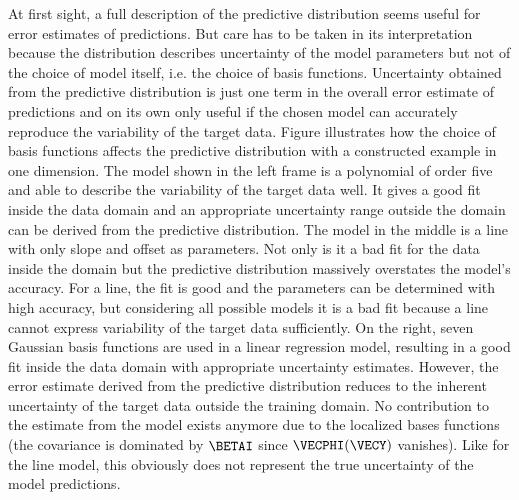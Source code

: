        {}

    At first sight, a full description of the predictive distribution seems
    useful for error estimates of predictions.  But care has to
    be taken in its interpretation because the distribution describes
    uncertainty of the model parameters but not of the choice of model itself,
    i.e. the choice of basis functions. Uncertainty obtained from the
    predictive distribution is just one term in the overall error estimate of
    predictions and on its own only useful if the chosen model can
    accurately reproduce the variability of the target data. Figure
     illustrates how the choice of basis functions
    affects the predictive distribution with a constructed example in one
    dimension. The model shown in the left frame is a polynomial of order five
    and able to describe the variability of the target data well. It
    gives a good fit inside the data domain and an appropriate uncertainty
    range outside the domain can be derived from the predictive distribution.
    The model in the middle is a line with only slope and offset as parameters.
    Not only is it a bad fit for the data inside the domain but the predictive
    distribution massively overstates the model's accuracy. For a line,
    the fit is good and the parameters can be determined with high
    accuracy, but considering all possible models it is a bad fit because a line
    cannot express variability of the target data sufficiently. On the right,
    seven Gaussian basis functions are used in a linear regression model,
    resulting in a good fit inside the data domain with appropriate uncertainty
    estimates. However, the error estimate derived from the predictive
    distribution reduces to the inherent uncertainty of the target data outside
    the training domain. No contribution to the estimate from the model exists
    anymore due to the localized bases functions (the covariance is dominated
    by $\BETAI$ since $\VECPHI(\VECY)$ vanishes). Like for the line model, this
    obviously does not represent the true uncertainty of the model predictions.

